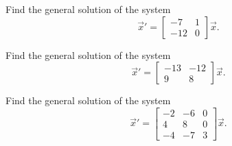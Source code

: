\begin{exercise}\ansMark%
Find the general solution of the system
\begin{equation*}
{\vec{x}}' = \begin{bmatrix} -7 & 1 \\ -12 & 0 \end{bmatrix} \vec{x}.
\end{equation*}
\end{exercise}
%

\begin{exercise}\ansMark%
Find the general solution of the system
\begin{equation*}
{\vec{x}}' = \begin{bmatrix} -13 & -12 \\ 9 & 8 \end{bmatrix} \vec{x}.
\end{equation*}
\end{exercise}
%

\begin{exercise}\ansMark%
Find the general solution of the system
\begin{equation*}
{\vec{x}}' = \begin{bmatrix} -2 & -6 & 0 \\ 4 & 8 & 0 \\ -4 & -7 & 3 \end{bmatrix} \vec{x}.
\end{equation*}
\end{exercise}
%

